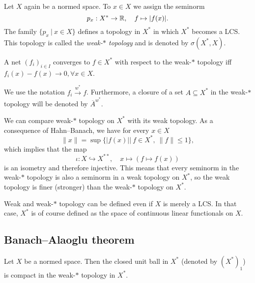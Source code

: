     Let $X$ again be a normed space. To $x \in X$ we assign the seminorm $$p_x: X^* \to \mathbb {R},\quad f \mapsto |f(x)|.$$
    The family $\{p_x\ |\ x \in X\}$ defines a topology in $X^*$ in which $X^*$ becomes a LCS.
    This topology is called the \emph{weak-$*$ topology} and is denoted by $\sigma (X^*, X)$.

\begin{proposition}
    A net $(f_i)_{i \in I}$ converges to $f \in X^*$ with respect to the weak-$*$ topology
    iff $f_i (x)- f (x) \to 0,\forall x \in X$.  
\end{proposition}

\begin{remark}
    We use the notation $f_i \xrightarrow{w^*} f$. Furthermore, a closure of a set $A \subseteq X^*$ in the weak-$*$ topology
    will be denoted by $\overline{A}^{w^*}$.  
\end{remark}

    We can compare weak-$*$ topology on $X^*$ with its weak topology.
    As a consequence of Hahn--Banach, we have for every $x \in X$ $$\| x\| = \sup\{|f(x)||\ f \in X^*,\ \| f\| \leq 1\},$$
    which implies that the map $$\iota: X \hookrightarrow X^{**},\quad x \mapsto (f \mapsto f(x))$$
    is an isometry and therefore injective. This means that every seminorm in the weak-$*$ topology is also 
    a seminorm in a weak topology on $X^*$, so the weak topology is finer (stronger) than the weak-$*$ topology on $X^*$.

\begin{remark}
    Weak and weak-$*$ topology can be defined even if $X$ is merely a LCS.
    In that case, $X^*$ is of course defined as the space of continuous linear functionals on $X$.
\end{remark}

\subsection{Banach--Alaoglu theorem}

\begin{theorem}
    Let $X$ be a normed space. Then the closed unit ball in $X^*$ (denoted by $(X^*)_1$) is compact in the weak-$*$ topology in $X^*$.
\end{theorem}

